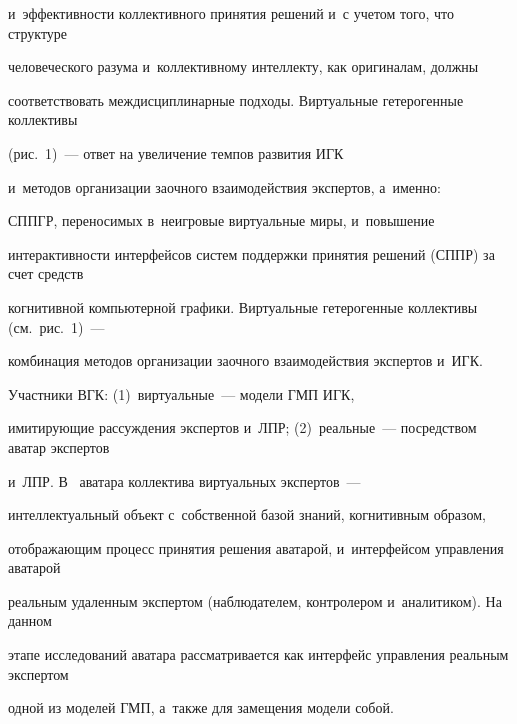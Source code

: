 и~эффективности коллективного принятия решений и~с учетом того, что структуре 


человеческого разума и~коллективному интеллекту, как оригиналам, должны 


соответствовать междисциплинарные подходы. Виртуальные гетерогенные коллективы 


(рис.~1)~--- ответ на увеличение темпов развития ИГК 


и~методов организации заочного взаимодействия экспертов, а~именно: 


СППГР, переносимых в~неигровые виртуальные миры, и~повышение 


интерактивности интерфейсов систем поддержки принятия решений (СППР) за счет средств 


когнитивной компьютерной графики. Виртуальные гетерогенные коллективы (см.\ рис.~1)~--- 


комбинация методов организации заочного взаимодействия экспертов и~ИГК.








  Участники ВГК: (1)~виртуальные~--- модели ГМП ИГК, 


имитирующие рассуждения экспертов и~ЛПР; (2)~реальные~--- посредством аватар экспертов 


и~ЛПР. В~\cite{8-rum} аватара коллектива виртуальных экспертов~--- 


интеллектуальный объект с~собственной базой знаний, когнитивным образом, 


отображающим процесс принятия решения аватарой, и~интерфейсом управ\-ле\-ния аватарой 


реальным удаленным экспертом (наблюдателем, контролером и~аналитиком). На данном 


этапе исследований аватара рассматривается как интерфейс управ\-ле\-ния реальным экспертом 


одной из моделей ГМП, а~также для замещения модели собой. 





